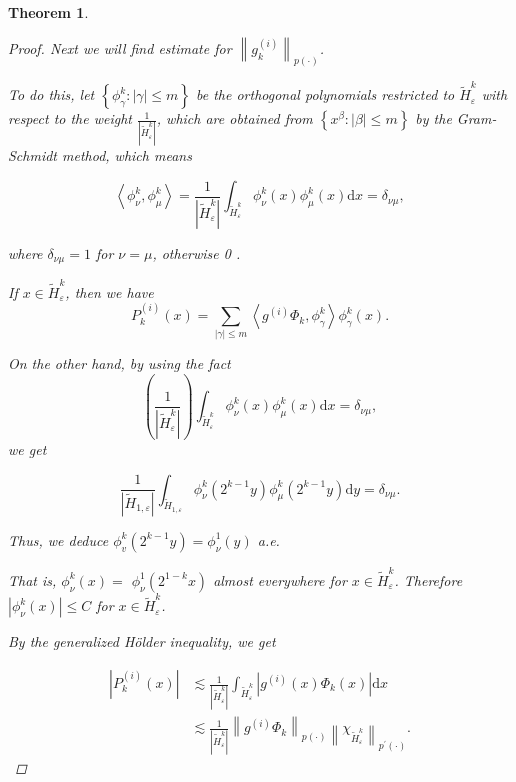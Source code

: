 \documentclass[oneside,reqno]{amsart}
\newtheorem{theorem}{Theorem}[section]
\numberwithin{equation}{section}
\theoremstyle{definition}
\begin{document}
\begin{theorem}
\begin{proof}
Next we will find estimate for 
 $\left\|g_{k}^{(i)}\right\|_{{p(\cdot)}}$.

To do this, let $\left\{\phi_{\gamma}^{k}:|\gamma| \leq  m\right\}$ be the orthogonal polynomials restricted to $\widetilde{H}^k_{ \varepsilon}$ with respect to the weight $\frac{1}{\left|\widetilde{H}^k_{ \varepsilon}\right|}$, which are obtained from $\left\{x^{\beta}:|\beta| \leq  m\right\}$ by the Gram-Schmidt method, which means


\begin{equation*}
\left\langle\phi_{\nu}^{k}, \phi_{\mu}^{k}\right\rangle=\frac{1}{\left|\widetilde{H}^k_{ \varepsilon}\right|} \int_{\widetilde{H}^k_{ \varepsilon}} \phi_{\nu}^{k}(x) \phi_{\mu}^{k}(x) \mathrm{d} x=\delta_{\nu \mu}, 
\end{equation*}


where $\delta_{\nu \mu}=1$ for $\nu=\mu$, otherwise 0 .



If $x \in \widetilde{H}^k_{ \varepsilon}$, then we have
$$P^{(i)}_{k}(x)=\sum_{|\gamma| \leq  m}\left\langle g^{(i)} \Phi_{k}, \phi_{\gamma}^{k}\right\rangle \phi_{\gamma}^{k}(x).$$

On the other hand, by using the fact $$\left(\frac{1} {\left|\widetilde{H}^k_{ \varepsilon}\right|}\right) \int_{\widetilde{H}^k_{ \varepsilon}} \phi_{\nu}^{k}(x) \phi_{\mu}^{k}(x) \mathrm{d} x=\delta_{\nu \mu},$$ we get


\begin{equation*}
\frac{1}{\left|\widetilde{H}_{1, \varepsilon}\right|} \int_{\widetilde{H}_{1, \varepsilon}} \phi_{\nu}^{k}\left(2^{k-1} y\right) \phi_{\mu}^{k}\left(2^{k-1} y\right) \mathrm{d} y=\delta_{\nu \mu}. 
\end{equation*}


Thus, we deduce $\phi_{v}^{k}\left(2^{k-1} y\right)=\phi_{\nu}^{1}(y)$ a.e. 


That is, $\phi_{\nu}^{k}(x)=$ $\phi_{\nu}^{1}\left(2^{1-k} x\right)$ almost everywhere for $x \in \widetilde{H}^k_{ \varepsilon}$. Therefore
$\left|\phi_{\nu}^{k}(x)\right| \leq  C$ for $x \in \widetilde{H}^k_{ \varepsilon}$. 


By the generalized H\"older inequality, we get


\begin{align*}
\left|P^{(i)}_{k}(x)\right| & \lesssim \frac{1}{\left|\widetilde{H}^k_{ \varepsilon}\right|} \int_{\widetilde{H}^k_{ \varepsilon}}\left|g^{(i)}(x) \Phi_{k}(x)\right| \mathrm{d} x \\
& \lesssim \frac{1}{\left|\widetilde{H}^k_{ \varepsilon}\right|}\left\|g^{(i)} \Phi_{k}\right\|_{{p(\cdot)}}\left\|\chi_{\widetilde{H}^k_{ \varepsilon}}\right\|_{{p^{\prime}(\cdot)}} .
\end{align*}



\end{proof}
\end{theorem}
\end{document}

